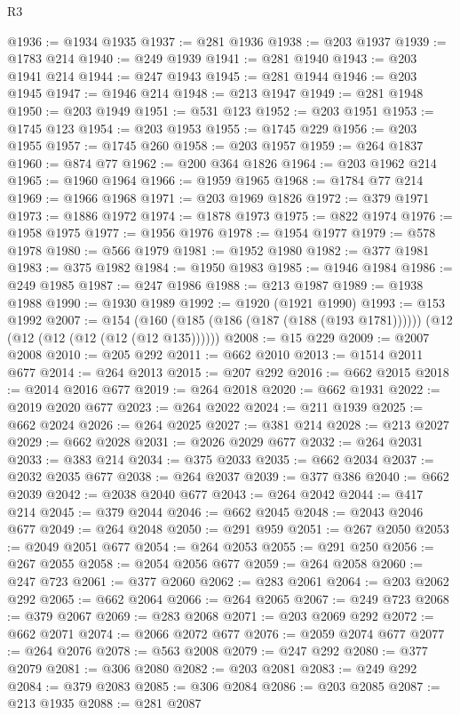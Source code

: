 \begin{lexlean}{R3}
\begin{coremodule}
@1936 := @1934 @1935
@1937 := @281 @1936
@1938 := @203 @1937
@1939 := @1783 @214
@1940 := @249 @1939
@1941 := @281 @1940
@1943 := @203 @1941 @214
@1944 := @247 @1943
@1945 := @281 @1944
@1946 := @203 @1945
@1947 := @1946 @214
@1948 := @213 @1947
@1949 := @281 @1948
@1950 := @203 @1949
@1951 := @531 @123
@1952 := @203 @1951
@1953 := @1745 @123
@1954 := @203 @1953
@1955 := @1745 @229
@1956 := @203 @1955
@1957 := @1745 @260
@1958 := @203 @1957
@1959 := @264 @1837
@1960 := @874 @77
@1962 := @200 @364 @1826
@1964 := @203 @1962 @214
@1965 := @1960 @1964
@1966 := @1959 @1965
@1968 := @1784 @77 @214
@1969 := @1966 @1968
@1971 := @203 @1969 @1826
@1972 := @379 @1971
@1973 := @1886 @1972
@1974 := @1878 @1973
@1975 := @822 @1974
@1976 := @1958 @1975
@1977 := @1956 @1976
@1978 := @1954 @1977
@1979 := @578 @1978
@1980 := @566 @1979
@1981 := @1952 @1980
@1982 := @377 @1981
@1983 := @375 @1982
@1984 := @1950 @1983
@1985 := @1946 @1984
@1986 := @249 @1985
@1987 := @247 @1986
@1988 := @213 @1987
@1989 := @1938 @1988
@1990 := @1930 @1989
@1992 := @1920 (@1921 @1990)
@1993 := @153 @1992
@2007 := @154
    (@160 (@185 (@186 (@187 (@188 (@193 @1781))))))
    (@12 (@12 (@12 (@12 (@12 (@12 @135))))))
@2008 := @15 @229
@2009 := @2007 @2008
@2010 := @205 @292
@2011 := @662 @2010
@2013 := @1514 @2011 @677
@2014 := @264 @2013
@2015 := @207 @292
@2016 := @662 @2015
@2018 := @2014 @2016 @677
@2019 := @264 @2018
@2020 := @662 @1931
@2022 := @2019 @2020 @677
@2023 := @264 @2022
@2024 := @211 @1939
@2025 := @662 @2024
@2026 := @264 @2025
@2027 := @381 @214
@2028 := @213 @2027
@2029 := @662 @2028
@2031 := @2026 @2029 @677
@2032 := @264 @2031
@2033 := @383 @214
@2034 := @375 @2033
@2035 := @662 @2034
@2037 := @2032 @2035 @677
@2038 := @264 @2037
@2039 := @377 @386
@2040 := @662 @2039
@2042 := @2038 @2040 @677
@2043 := @264 @2042
@2044 := @417 @214
@2045 := @379 @2044
@2046 := @662 @2045
@2048 := @2043 @2046 @677
@2049 := @264 @2048
@2050 := @291 @959
@2051 := @267 @2050
@2053 := @2049 @2051 @677
@2054 := @264 @2053
@2055 := @291 @250
@2056 := @267 @2055
@2058 := @2054 @2056 @677
@2059 := @264 @2058
@2060 := @247 @723
@2061 := @377 @2060
@2062 := @283 @2061
@2064 := @203 @2062 @292
@2065 := @662 @2064
@2066 := @264 @2065
@2067 := @249 @723
@2068 := @379 @2067
@2069 := @283 @2068
@2071 := @203 @2069 @292
@2072 := @662 @2071
@2074 := @2066 @2072 @677
@2076 := @2059 @2074 @677
@2077 := @264 @2076
@2078 := @563 @2008
@2079 := @247 @292
@2080 := @377 @2079
@2081 := @306 @2080
@2082 := @203 @2081
@2083 := @249 @292
@2084 := @379 @2083
@2085 := @306 @2084
@2086 := @203 @2085
@2087 := @213 @1935
@2088 := @281 @2087

\end{coremodule}
\end{lexlean}
